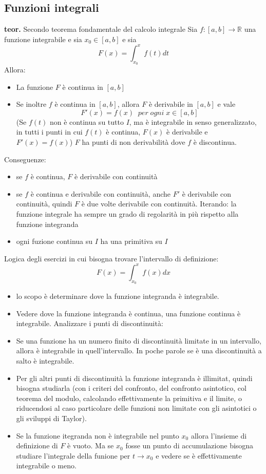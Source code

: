 \subsection{Funzioni integrali}
\textbf{teor.} Secondo teorema fondamentale del calcolo integrale \newline
Sia $f: [a,b] \rightarrow \mathbb{R}$ una funzione integrabile e sia $x_0 \in [a,b]$ e sia 
\[
    F(x) = \int_{x_0}^{x} f(t) dt
\]
Allora:
\begin{itemize}
    \item La funzione $F$ è continua in $[a,b]$
    \item Se inoltre $f$ è continua in $[a,b]$, allora $F$ è derivabile in $[a,b]$ e vale
    \[
        F'(x) = f(x) \;\; per \; ogni \; x \in[a,b]
    \]
    (Se $f(t)$ non è continua su tutto $I$, ma è integrabile in senso generalizzato, in tutti i punti in cui $f(t)$ è continua, $F(x)$ è derivabile e $F'(x) = f(x)$)\newline
    $F$ ha punti di non derivabilità dove $f$ è discontinua.
\end{itemize}
Conseguenze:
\begin{itemize}
    \item se $f$ è continua, $F$ è derivabile con continuità
    \item se $f$ è continua e derivabile con continuità, anche $F'$ è derivabile con continuità, quindi $F$ è due volte derivabile con continuità. Iterando: la funzione integrale ha sempre un grado di regolarità in più rispetto alla funzione integranda
    \item ogni fuzione continua su $I$ ha una primitiva su $I$
\end{itemize}
Logica degli esercizi in cui bisogna trovare l'intervallo di definizione:
\[
    F(x) = \int_{x_0}^{x}f(x)dx
\]
\begin{itemize}
    \item lo scopo è determinare dove la funzione integranda è integrabile.
    \item Vedere dove la funzione integranda è continua, una funzione continua è integrabile. Analizzare i punti di discontinuità:
    \item Se una funzione ha un numero finito di discontinuità limitate in un intervallo, allora è integrabile in quell'intervallo. In poche parole se è una discontinuità a salto è integrabile.
    \item Per gli altri punti di discontinuità la funzione integranda è illimitat, quindi bisogna studiarla (con i criteri del confronto, del confronto asintotico, col teorema del modulo, calcolando effettivamente la primitiva e il limite, o riducendosi al caso particolare delle funzioni non limitate con gli asintotici o gli sviluppi di Taylor).
    \item Se la funzione itegranda non è integrabile nel punto $x_0$ allora l'insieme di definizione di $F$ è vuoto. Ma se $x_0$ fosse un punto di accumulazione bisogna studiare l'integrale della funione per $t \rightarrow x_0$ e vedere se è effettivamente integrabile o meno.
\end{itemize}
